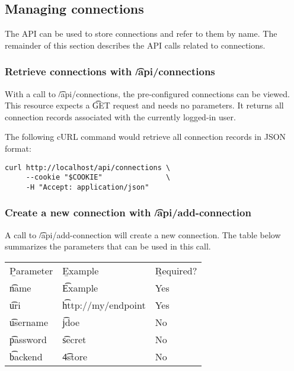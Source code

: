\subsection{Managing connections}

  The API can be used to store connections and refer to them by name.  The
  remainder of this section describes the API calls related to connections.

\subsubsection{Retrieve connections with \t{/api/connections}}

  With a call to \t{/api/connections}, the pre-configured connections
  can be viewed.  This resource expects a \t{GET} request and needs no
  parameters.  It returns all connection records associated with the currently
  logged-in user.

  The following cURL command would retrieve all connection records in JSON
  format:

\begin{siderules}
\begin{verbatim}
curl http://localhost/api/connections \
     --cookie "$COOKIE"               \
     -H "Accept: application/json"
\end{verbatim}
\end{siderules}

\subsubsection{Create a new connection with \t{/api/add-connection}}
\label{sec:api-create-connection}

  A call to \t{/api/add-connection} will create a new connection.
  The table below summarizes the parameters that can be used in this call.

  \hypersetup{urlcolor=black}
  \begin{table}[H]
    \begin{tabularx}{\textwidth}{l!{\VRule[-1pt]}X!{\VRule[-1pt]}X}
      \headrow
      \b{Parameter} & \b{Example}            & \b{Required?}\\
      \evenrow
      \t{name}      & \t{Example}            & Yes\\
      \oddrow
      \t{uri}       & \t{http://my/endpoint} & Yes\\
      \evenrow
      \t{username}  & \t{jdoe}               & No\\
      \oddrow
      \t{password}  & \t{secret}             & No\\
      \evenrow
      \t{backend}   & \t{4store}             & No\\
    \end{tabularx}
  \end{table}
  \hypersetup{urlcolor=LinkGray}

